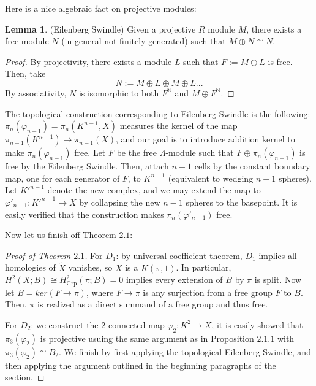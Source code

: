 \documentclass{article}
\theoremstyle{definition}
\theoremstyle{definition}
\theoremstyle{definition}
\theoremstyle{definition}
\theoremstyle{definition}
\newtheorem{lemma}[theorem]{Lemma}
\theoremstyle{definition}
\theoremstyle{definition}
\begin{document}
Here is a nice algebraic fact on projective modules:

\begin{tcolorbox}
\begin{lemma}
(Eilenberg Swindle) Given a projective $R$ module $M$, there exists a free module $N$ (in general not finitely generated) such that $M\oplus N\cong N$.
\end{lemma}
\end{tcolorbox}
\begin{proof}
  By projectivity, there exists a module $L$ such that $F:=M\oplus L$ is free. Then, take 
  \[N:=M\oplus L\oplus M\oplus L...\]
  By associativity, $N$ is isomorphic to both $F^{\mathbb{N}}$ and $M\oplus F^{\mathbb{N}}$.
\end{proof}
The topological construction corresponding to Eilenberg Swindle is the following: $\pi_n(\varphi_{n-1})=\pi_n(K^{n-1},X)$ measures the kernel of the map $\pi_{n-1}(K^{n-1})\to \pi_{n-1}(X)$, and our goal is to introduce addition kernel to make $\pi_n(\varphi_{n-1})$ free. Let $F$ be the free $\Lambda$-module such that $F\oplus \pi_n(\varphi_{n-1})$ is free by the Eilenberg Swindle. Then, attach $n-1$ cells by the constant boundary map, one for each generator of $F$, to $K^{n-1}$ (equivalent to wedging $n-1$ spheres). Let $K'^{n-1}$ denote the new complex, and we may extend the map to $\varphi'_{n-1}: K'^{n-1}\to X$ by collapsing the new $n-1$ spheres to the basepoint. It is easily verified that the construction makes $\pi_n(\varphi'_{n-1})$ free. 

Now let us finish off Theorem $2.1$:
\begin{proof}[Proof of Theorem $2.1$]
 For $D_1$: by universal coefficient theorem, $D_1$ implies all homologies of $\tilde{X}$ vanishes, so $X$ is a $K(\pi,1)$. In particular, $H^2(X;B)\cong H^2_{\textrm{Grp}}(\pi;B)=0$ implies every extension of $B$ by $\pi$ is split. Now let $B=ker(F\to \pi)$, where $F\to \pi$ is any surjection from a free group $F$ to $B$. Then, $\pi$ is realized as a direct summand of a free group and thus free. 

 For $D_2$: we construct the $2$-connected map $\varphi_2: K^2\to X$, it is easily showed that $\pi_3(\varphi_2)$ is projective usuing the same argument as in Proposition $2.1.1$ with $\pi_3(\varphi_2)\cong B_2$. We finish by first applying the topological Eilenberg Swindle, and then applying the argument outlined in the beginning paragraphs of the section.
\end{proof}
\end{document}
